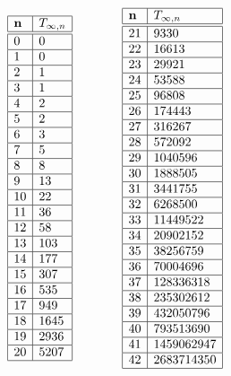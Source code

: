 \documentclass{sig-alternate}
\newcommand{\nbt}[1]{T_{\infty,#1}}
\begin{document}
\begin{displaymath}
  \begin{array}{|l|l|}
    \hline
    \mathbf{n} & \nbt{n}\\\hline\hline
    0&0\\\hline
    1&0\\\hline
    2&1\\\hline
    3&1\\\hline
    4&2\\\hline
    5&2\\\hline
    6&3\\\hline
    7&5\\\hline
    8&8\\\hline
    9&13\\\hline
    10&22\\\hline
    11&36\\\hline
    12&58\\\hline
    13&103\\\hline
    14&177\\\hline
    15&307\\\hline
    16&535\\\hline
    17&949\\\hline
    18&1645\\\hline
    19&2936\\\hline
    20&5207\\\hline
  \end{array}
  \qquad\qquad
  \begin{array}{|l|l|}
    \hline
    \mathbf{n} & \nbt{n}\\\hline\hline
    21&9330\\\hline
    22&16613\\\hline
    23&29921\\\hline
    24&53588\\\hline
    25&96808\\\hline
    26&174443\\\hline
    27&316267\\\hline
    28&572092\\\hline
    29&1040596\\\hline
    30&1888505\\\hline
    31&3441755\\\hline
    32&6268500\\\hline
    33&11449522\\\hline
    34&20902152\\\hline
    35&38256759\\\hline
    36&70004696\\\hline
    37&128336318\\\hline
    38&235302612\\\hline
    39&432050796\\\hline
    40&793513690\\\hline
    41 & 1459062947\\\hline
    42& 2683714350\\\hline
  \end{array}
\end{displaymath}
\end{document}
